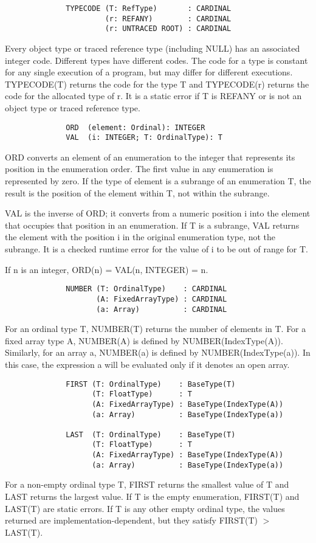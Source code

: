 \documentclass[10pt]{article}
\begin{document}
\begin{verbatim}
              TYPECODE (T: RefType)       : CARDINAL
                       (r: REFANY)        : CARDINAL
                       (r: UNTRACED ROOT) : CARDINAL
\end{verbatim}
Every object type or traced reference type (including NULL) has an associated
integer code. Different types have different codes. The code for a type is
constant for any single execution of a program, but may differ for different
executions. TYPECODE(T) returns the code for the type T and TYPECODE(r)
returns the code for the allocated type of r. It is a static error if T is
REFANY or is not an object type or traced reference type.

\begin{verbatim}
              ORD  (element: Ordinal): INTEGER
              VAL  (i: INTEGER; T: OrdinalType): T
\end{verbatim}
ORD converts an element of an enumeration to the integer that represents its
position in the enumeration order. The first value in any enumeration is
represented by zero. If the type of element is a subrange of an enumeration T,
the result is the position of the element within T, not within the subrange.

VAL is the inverse of ORD; it converts from a numeric position i into the
element that occupies that position in an enumeration. If T is a subrange, VAL
returns the element with the position i in the original enumeration type, not
the subrange. It is a checked runtime error for the value of i to be out of
range for T.

If n is an integer, ORD(n) = VAL(n, INTEGER) = n.

\begin{verbatim}
              NUMBER (T: OrdinalType)    : CARDINAL
                     (A: FixedArrayType) : CARDINAL
                     (a: Array)          : CARDINAL
\end{verbatim}
For an ordinal type T, NUMBER(T) returns the number of elements in T. For a
fixed array type A, NUMBER(A) is defined by NUMBER(IndexType(A)). Similarly,
for an array a, NUMBER(a) is defined by NUMBER(IndexType(a)). In this case,
the expression a will be evaluated only if it denotes an open array.

\begin{verbatim}
              FIRST (T: OrdinalType)    : BaseType(T)
                    (T: FloatType)      : T
                    (A: FixedArrayType) : BaseType(IndexType(A))
                    (a: Array)          : BaseType(IndexType(a))

              LAST  (T: OrdinalType)    : BaseType(T)
                    (T: FloatType)      : T
                    (A: FixedArrayType) : BaseType(IndexType(A))
                    (a: Array)          : BaseType(IndexType(a))
\end{verbatim}
For a non-empty ordinal type T, FIRST returns the smallest value of T and LAST
returns the largest value. If T is the empty enumeration, FIRST(T) and LAST(T)
are static errors. If T is any other empty ordinal type, the values returned
are implementation-dependent, but they satisfy FIRST(T) $>$ LAST(T).
\end{document}
